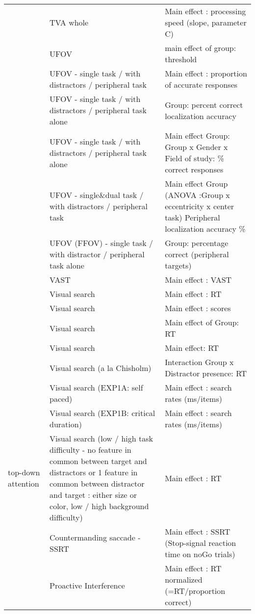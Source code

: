 \documentclass[
]{book}
\begin{document}
\begin{tabular}{l|l|l}
\cline{2-3}
 & TVA whole & Main effect : processing speed (slope, parameter C)\\
\cline{2-3}
 & UFOV & main effect of group: threshold\\
\cline{2-3}
 & UFOV - single task / with distractors / peripheral task & Main effect : proportion of accurate responses\\
\cline{2-3}
 & UFOV - single task / with distractors / peripheral task alone & Group: percent correct localization accuracy\\
\cline{2-3}
 & UFOV - single task / with distractors / peripheral task alone & Main effect Group: Group x Gender x Field of study: \% correct responses\\
\cline{2-3}
 & UFOV - single\&dual task / with distractors / peripheral task & Main effect Group (ANOVA :Group x eccentricity x center task) Peripheral localization accuracy \%\\
\cline{2-3}
 & UFOV (FFOV) - single task / with distractor / peripheral task alone & Group: percentage correct (peripheral targets)\\
\cline{2-3}
 & VAST & Main effect : VAST\\
\cline{2-3}
 & Visual search & Main effect : RT\\
\cline{2-3}
 & Visual search & Main effect : scores\\
\cline{2-3}
 & Visual search & Main effect of Group: RT\\
\cline{2-3}
 & Visual search & Main effect: RT\\
\cline{2-3}
 & Visual search (a la Chisholm) & Interaction Group x Distractor presence: RT\\
\cline{2-3}
 & Visual search (EXP1A: self paced) & Main effect : search rates (ms/items)\\
\cline{2-3}
 & Visual search (EXP1B: critical duration) & Main effect : search rates (ms/items)\\
\cline{2-3}
\multirow[t]{-75}{*}{\raggedright\arraybackslash top-down attention} & Visual search (low / high task difficulty - no feature in common between target and distractors or 1 feature in common between distractor and target : either size or color, low / high background difficulty) & Main effect : RT\\
\cline{1-3}
 & Countermanding saccade - SSRT & Main effect : SSRT (Stop-signal reaction time on noGo trials)\\
\cline{2-3}
 & Proactive Interference & Main effect : RT normalized (=RT/proportion correct)\\

\end{tabular}
\end{document}

